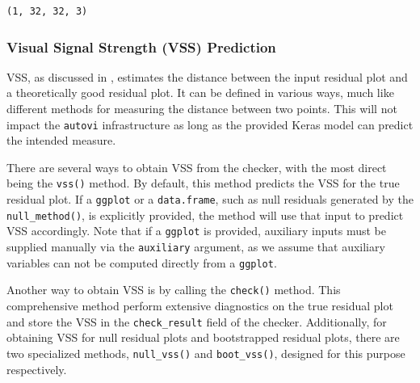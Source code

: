 \documentclass[
doublespace,
  times]{anzsauth}
\newenvironment{Shaded}{\begin{snugshade}}{\end{snugshade}}
\newcommand{\AttributeTok}[1]{\textcolor[rgb]{0.40,0.45,0.13}{#1}}
\newcommand{\FunctionTok}[1]{\textcolor[rgb]{0.28,0.35,0.67}{#1}}
\newcommand{\NormalTok}[1]{\textcolor[rgb]{0.00,0.23,0.31}{#1}}
\newcommand{\OtherTok}[1]{\textcolor[rgb]{0.00,0.23,0.31}{#1}}
\newcommand{\SpecialCharTok}[1]{\textcolor[rgb]{0.37,0.37,0.37}{#1}}
\begin{document}
\begin{Shaded}
\end{Shaded}

\begin{verbatim}
(1, 32, 32, 3)
\end{verbatim}

\subsubsection{Visual Signal Strength (VSS)
Prediction}\label{visual-signal-strength-vss-prediction}

VSS, as discussed in \citet{li2024automated}, estimates the distance
between the input residual plot and a theoretically good residual plot.
It can be defined in various ways, much like different methods for
measuring the distance between two points. This will not impact the
\texttt{autovi} infrastructure as long as the provided Keras model can
predict the intended measure.

There are several ways to obtain VSS from the checker, with the most
direct being the \texttt{vss()} method. By default, this method predicts
the VSS for the true residual plot. If a \texttt{ggplot} or a
\texttt{data.frame}, such as null residuals generated by the
\texttt{null\_method()}, is explicitly provided, the method will use
that input to predict VSS accordingly. Note that if a \texttt{ggplot} is
provided, auxiliary inputs must be supplied manually via the
\texttt{auxiliary} argument, as we assume that auxiliary variables can
not be computed directly from a \texttt{ggplot}.

Another way to obtain VSS is by calling the \texttt{check()} method.
This comprehensive method perform extensive diagnostics on the true
residual plot and store the VSS in the \texttt{check\_result} field of
the checker. Additionally, for obtaining VSS for null residual plots and
bootstrapped residual plots, there are two specialized methods,
\texttt{null\_vss()} and \texttt{boot\_vss()}, designed for this purpose
respectively.
\end{document}
